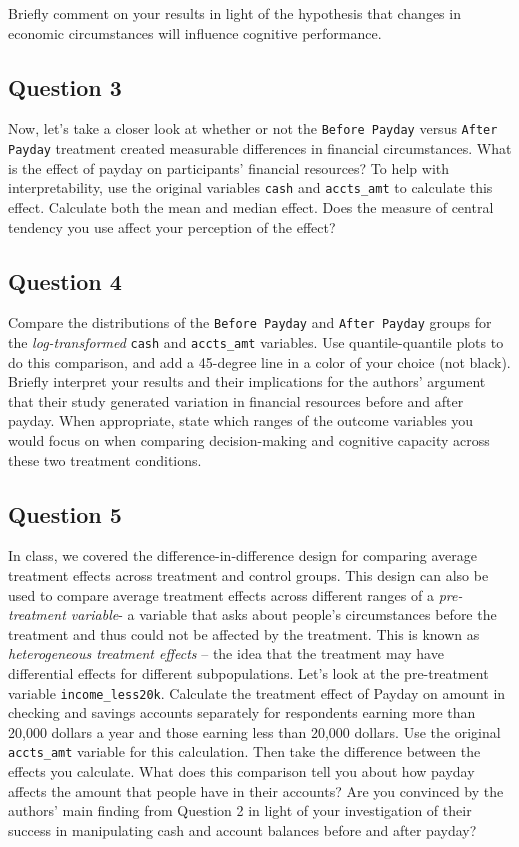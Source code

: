 \documentclass[]{article}
\begin{document}
Briefly comment on your results in light of the hypothesis that changes
in economic circumstances will influence cognitive performance.

\subsection{Question 3}\label{question-3}

Now, let's take a closer look at whether or not the
\texttt{Before Payday} versus \texttt{After Payday} treatment created
measurable differences in financial circumstances. What is the effect of
payday on participants' financial resources? To help with
interpretability, use the original variables \texttt{cash} and
\texttt{accts\_amt} to calculate this effect. Calculate both the mean
and median effect. Does the measure of central tendency you use affect
your perception of the effect?

\subsection{Question 4}\label{question-4}

Compare the distributions of the \texttt{Before Payday} and
\texttt{After Payday} groups for the \emph{log-transformed}
\texttt{cash} and \texttt{accts\_amt} variables. Use quantile-quantile
plots to do this comparison, and add a 45-degree line in a color of your
choice (not black). Briefly interpret your results and their
implications for the authors' argument that their study generated
variation in financial resources before and after payday. When
appropriate, state which ranges of the outcome variables you would focus
on when comparing decision-making and cognitive capacity across these
two treatment conditions.

\subsection{Question 5}\label{question-5}

In class, we covered the difference-in-difference design for comparing
average treatment effects across treatment and control groups. This
design can also be used to compare average treatment effects across
different ranges of a \emph{pre-treatment variable}- a variable that
asks about people's circumstances before the treatment and thus could
not be affected by the treatment. This is known as \emph{heterogeneous
treatment effects} -- the idea that the treatment may have differential
effects for different subpopulations. Let's look at the pre-treatment
variable \texttt{income\_less20k}. Calculate the treatment effect of
Payday on amount in checking and savings accounts separately for
respondents earning more than 20,000 dollars a year and those earning
less than 20,000 dollars. Use the original \texttt{accts\_amt} variable
for this calculation. Then take the difference between the effects you
calculate. What does this comparison tell you about how payday affects
the amount that people have in their accounts? Are you convinced by the
authors' main finding from Question 2 in light of your investigation of
their success in manipulating cash and account balances before and after
payday?
\end{document}
